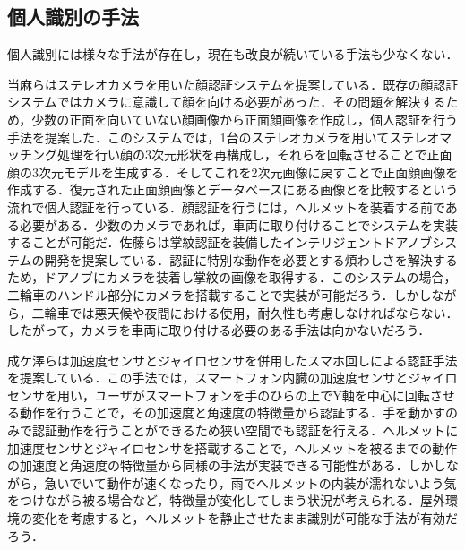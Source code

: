 \documentclass[Japanese]{dicomopapers}
\begin{document}
\subsection{個人識別の手法}
個人識別には様々な手法が存在し，現在も改良が続いている手法も少なくない．\par
当麻らはステレオカメラを用いた顔認証システムを提案している\cite{face}．既存の顔認証システムではカメラに意識して顔を向ける必要があった．その問題を解決するため，少数の正面を向いていない顔画像から正面顔画像を作成し，個人認証を行う手法を提案した．このシステムでは，1台のステレオカメラを用いてステレオマッチング処理を行い顔の3次元形状を再構成し，それらを回転させることで正面顔の3次元モデルを生成する．そしてこれを2次元画像に戻すことで正面顔画像を作成する．復元された正面顔画像とデータベースにある画像とを比較するという流れで個人認証を行っている．顔認証を行うには，ヘルメットを装着する前である必要がある．少数のカメラであれば，車両に取り付けることでシステムを実装することが可能だ．佐藤らは掌紋認証を装備したインテリジェントドアノブシステムの開発を提案している\cite{door}．認証に特別な動作を必要とする煩わしさを解決するため，ドアノブにカメラを装着し掌紋の画像を取得する．このシステムの場合，二輪車のハンドル部分にカメラを搭載することで実装が可能だろう．しかしながら，二輪車では悪天候や夜間における使用，耐久性も考慮しなければならない．したがって，カメラを車両に取り付ける必要のある手法は向かないだろう．\par
成ケ澤らは加速度センサとジャイロセンサを併用したスマホ回しによる認証手法を提案している\cite{acceleration}．この手法では，スマートフォン内臓の加速度センサとジャイロセンサを用い，ユーザがスマートフォンを手のひらの上でY軸を中心に回転させる動作を行うことで，その加速度と角速度の特徴量から認証する．手を動かすのみで認証動作を行うことができるため狭い空間でも認証を行える．ヘルメットに加速度センサとジャイロセンサを搭載することで，ヘルメットを被るまでの動作の加速度と角速度の特徴量から同様の手法が実装できる可能性がある．しかしながら，急いでいて動作が速くなったり，雨でヘルメットの内装が濡れないよう気をつけながら被る場合など，特徴量が変化してしまう状況が考えられる．屋外環境の変化を考慮すると，ヘルメットを静止させたまま識別が可能な手法が有効だろう．\par
\end{document}
